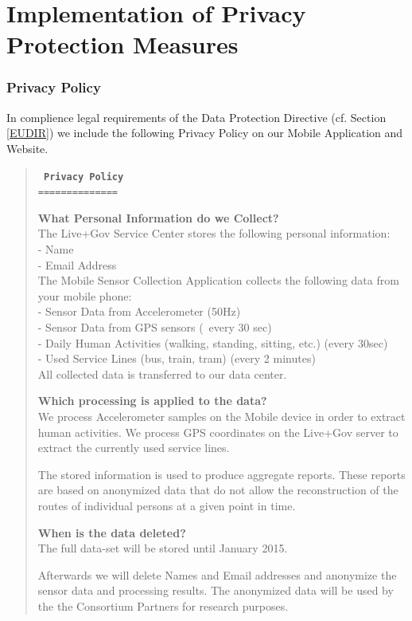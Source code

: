 \chapter{Implementation of Privacy Protection Measures}
\subsection{Privacy Policy}

In complience legal requirements of the Data Protection Directive (cf. Section \ref{EUDIR}) we include the following
Privacy Policy on our Mobile Application and Website.

\begin{quote}
\tt \small
\textbf{Privacy Policy}\\
        ==============

\textbf{What Personal Information do we Collect?}\\
The Live+Gov Service Center stores the following personal information:\\
- Name\\
- Email Address\\

The Mobile Sensor Collection Application collects the following data from your mobile phone:\\
- Sensor Data from Accelerometer (50Hz)\\
- Sensor Data from GPS sensors (~every 30 sec)\\
- Daily Human Activities (walking, standing, sitting, etc.) (every 30sec)\\
- Used Service Lines (bus, train, tram) (every 2 minutes)\\

All collected data is transferred to our data center.

\textbf{Which processing is applied to the data?}\\
We process Accelerometer samples on the Mobile device in order to extract human activities.
We process GPS coordinates on the Live+Gov server to extract the currently used service lines.

The stored information is used to produce aggregate reports.
These reports are based on anonymized data that do not allow the reconstruction of the routes of individual persons at a given point in time.

\textbf{When is the data deleted?}\\
The full data-set will be stored until January 2015.

Afterwards we will delete Names and Email addresses and anonymize
the sensor data and processing results.  The anonymized data will
be used by the the Consortium Partners for research purposes.


\end{quote}
